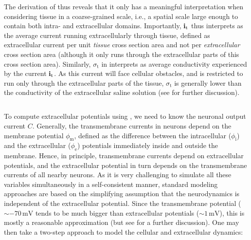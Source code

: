 The derivation of  thus reveals that it only has a meaningful interpretation when considering tissue in a coarse-grained scale, i.e., a spatial scale large enough to contain both intra- and extracellular domains. Importantly, ${\bf i}_\text{t}$ thus interprets as the average current running extracellularly through tissue, defined as extracellular current per unit \textit{tissue} cross section area and not per \textit{extracellular} cross section area (although it only runs through the extracellular parts of this cross section area). Similarly, $\sigma_\text{t}$ in  interprets as average conductivity experienced by the current ${\bf i}_\text{t}$. As this current will face cellular obstacles, and is restricted to run only through the extracellular parts of the tissue, $\sigma_\text{t}$ is generally lower than the conductivity of the extracellular saline solution (see  for further discussion). 


\subsection{}
\label{sec:Basics:twostep}
To compute extracellular potentials using , we need to know the neuronal output current $C$. Generally, the transmembrane currents in neurons depend on the membrane potential $\phi_\text{m}$, defined as the difference between the intracellular ($\phi_\text{i}$) and the extracellular ($\phi_\text{e}$) potentials immediately inside and outside the membrane. Hence, in principle, transmembrane currents depend on extracellular potentials, and the extracellular potential in turn depends on the transmembrane currents of all nearby neurons. As it is very challenging to simulate all these variables simultaneously in a self-consistent manner, standard modeling approaches are based on the simplifying assumption that the neurodynamics is independent of the extracellular potential. Since the transmembrane potential ($\sim -70 \, \si{\milli\volt}$ tends to be much bigger than extracellular potentials ($\sim 1 \,\si{\milli\volt}$), this is mostly a reasonable approximation (but see  for a further discussion). One may then take a two-step approach to model the cellular and extracellular dynamics:

